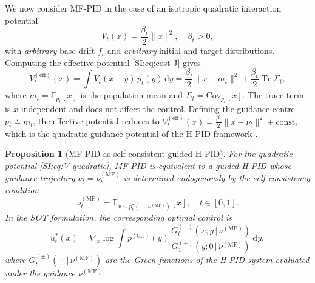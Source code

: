 \documentclass[11pt,onecolumn]{article}
\newcommand{\dd}{\mathrm{d}}
\newcommand{\tr}{\operatorname{Tr}}
\newcommand{\ptar}{p^{(\mathrm{tar})}}
\newcommand{\MF}{\mathrm{MF}}
\newcommand{\Veff}{V^{(\mathrm{eff})}}
\newtheorem{proposition}[theorem]{Proposition}
\begin{document}
We now consider MF-PID in the case of an isotropic quadratic interaction
potential
\begin{equation}
  V_t(x) = \frac{\beta_t}{2}\|x\|^2, \quad \beta_t > 0,
  \label{SI:eq:V-quadratic}
\end{equation}
with \emph{arbitrary} base drift $f_t$ and \emph{arbitrary} initial and target distributions. Computing the effective potential \eqref{SI:eq:cost-J} gives
\begin{equation}
  \Veff_t(x) = \int V_t(x-y)\,p_t(y)\,\dd y= \frac{\beta_t}{2}\|x - m_t\|^2 + \frac{\beta_t}{2}\tr\Sigma_t,
  \label{SI:eq:Veff-quad}
\end{equation}
where $m_t = \mathbb{E}_{p_t}[x]$ is the population mean and $\Sigma_t = \mathrm{Cov}_{p_t}[x]$. The trace term is $x$-independent and does not affect the control. Defining the guidance centre $\nu_t \doteq m_t$, the effective potential reduces to $\Veff_t(x) = \tfrac{\beta_t}{2}\|x-\nu_t\|^2 + \text{const}$, which is the quadratic guidance potential of the H-PID framework \cite{behjoo_harmonic_2025,chertkov_generative_2025}.

\begin{proposition}[MF-PID as self-consistent guided H-PID]
\label{prop:mf-hpid}
For the quadratic potential \eqref{SI:eq:V-quadratic}, MF-PID is equivalent to a guided H-PID whose guidance trajectory $\nu_t = \nu_t^{(\MF)}$ is determined endogenously by the self-consistency condition
\begin{equation}
  \nu_t^{(\MF)}= \mathbb{E}_{x\sim p_t^{*}(\,\cdot\,|\,\nu^{(\MF)})}[x], \quad t\in[0,1].
  \label{SI:eq:self-consistency}
\end{equation}
In the SOT formulation, the corresponding optimal control is
\begin{equation}
  u_t^*(x)= \nabla_x\log\int\!\!\ptar(y)\,\frac{G_t^{(-)}(x;y\,|\,\nu^{(\MF)})}{G_1^{(+)}(y;0\,|\,\nu^{(\MF)})}\,\dd y,
  \label{SI:eq:u-star-quad}
\end{equation}
where $G_t^{(\pm)}(\,\cdot\,|\,\nu^{(\MF)})$ are the Green functions of the H-PID system evaluated under the guidance $\nu^{(\MF)}$.
\end{proposition}
\end{document}
